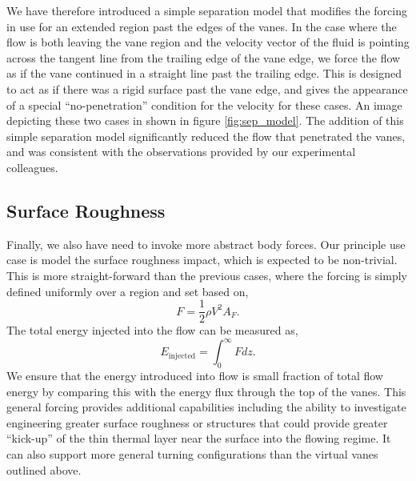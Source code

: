 We have therefore introduced a simple separation model that modifies the forcing in use for an extended
region past the edges of the vanes. In the case where the flow is both leaving the vane region and 
the velocity vector of the fluid is pointing across the tangent line from the trailing edge of the vane edge, 
we force the flow as if the vane continued in a straight line past the trailing edge. This is designed to 
act as if there was a rigid surface past the vane edge, and gives the appearance of a special 
``no-penetration'' condition for the velocity for these cases. An image depicting these two cases in shown in 
figure \ref{fig:sep_model}. The addition of this simple separation model significantly reduced the flow that 
penetrated the vanes, and was consistent with the observations provided by our experimental colleagues. 

\subsection{Surface Roughness}

Finally, we also have need to invoke more abstract body forces. 
Our principle use case is model the surface roughness
impact, which is expected to be non-trivial\cite{oke1987boundary}. This
is more straight-forward than the previous cases, where the forcing is
simply defined uniformly over a region and set based on, 
\begin{equation}
 F = \frac{1}{2}\rho V^2 A_F. 
\end{equation}
The total energy injected into the flow can be measured as, 
\begin{equation}
 E_{\text{injected}} = \int_0^\infty F dz. 
\end{equation}
We ensure that the energy introduced into flow is small fraction of
total flow energy by comparing this with the energy flux through the top
of the vanes. 
This general forcing provides additional capabilities including the
ability to investigate engineering greater surface roughness or
structures that could provide greater ``kick-up'' of the thin thermal
layer near the surface into the flowing regime. It can also support more
general turning configurations than the virtual vanes outlined above. 
